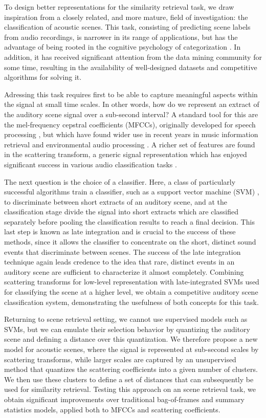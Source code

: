 \documentclass[journal]{IEEEtran}
\begin{document}
To design better representations for the similarity retrieval task, we draw inspiration from a closely related, and more mature, field of investigation: the classification of acoustic scenes. This task, consisting of predicting scene labels from audio recordings, is narrower in its range of applications, but has the advantage of being rooted in the cognitive psychology of categorization \cite{dubois2006cognitive,guastavino_ideal_2006}. In addition, it has received significant attention from the data mining community for some time, resulting in the availability of well-designed datasets and competitive algorithms for solving it.

Adressing this task requires first to be able to capture meaningful aspects within the signal at small time scales. In other words, how do we represent an extract of the auditory scene signal over a sub-second interval? A standard tool for this are the mel-frequency cepstral coefficients (MFCCs), originally developed for speech processing \cite{davis-mermelstein}, but which have found wider use in recent years in music information retrieval \cite{logan} and environmental audio processing \cite{aucouturier2007bag}. A richer set of features are found in the scattering transform, a generic signal representation which has enjoyed significant success in various audio classification tasks \cite{Anden2014}.

The next question is the choice of a classifier. Here, a class of particularly successful algorithms train a classifier, such as a support vector machine (SVM) \cite{cristianini2000introduction}, to discriminate between short extracts of an auditory scene, and at the classification stage divide the signal into short extracts which are classified separately before pooling the classification results to reach a final decision. This last step is known as late integration and is crucial to the success of these methods, since it allows the classifier to concentrate on the short, distinct sound events that discriminate between scenes. The success of the late integration technique again leads credence to the idea that rare, distinct events in an auditory scene are sufficient to characterize it almost completely. Combining scattering transforms for low-level representation with late-integrated SVMs used for classifying the scene at a higher level, we obtain a competitive auditory scene classification system, demonstrating the usefulness of both concepts for this task.

Returning to scene retrieval setting, we cannot use supervised models such as SVMs, but we can emulate their selection behavior by quantizing the auditory scene and defining a distance over this quantization. We therefore propose a new model for acoustic scenes, where the signal is represented at sub-second scales by scattering transforms, while larger scales are captured by an unsupervised method that quantizes the scattering coefficients into a given number of clusters. We then use these clusters to define a set of distances that can subsequently be used for similarity retrieval. Testing this approach on an scene retrieval task, we obtain significant improvements over traditional bag-of-frames and summary statistics models, applied both to MFCCs and scattering coefficients.
\end{document}
